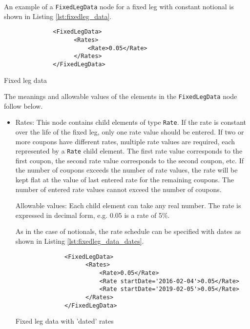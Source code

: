 An example of a \lstinline!FixedLegData! node for a fixed leg with constant notional is shown in Listing \ref{lst:fixedleg_data}.
\begin{listing}[H]
\begin{verbatim}
              <FixedLegData>
                    <Rates>
                        <Rate>0.05</Rate>
                    </Rates>
              </FixedLegData>
\end{verbatim}
\caption{Fixed leg data}
\label{lst:fixedleg_data}
\end{listing}

The meanings and allowable values of the elements in the \lstinline!FixedLegData! node follow below.

\begin{itemize}

\item Rates: This node contains child elements of type
  \lstinline!Rate!. If the rate is constant over the life of the fixed
  leg, only one rate value should be entered. If two or more coupons
  have different rates, multiple rate values are required, each
  represented by a \lstinline!Rate! child element. The first rate
  value corresponds to the first coupon, the second rate value
  corresponds to the second coupon, etc. If the number of coupons
  exceeds the number of rate values, the rate will be kept flat at the
  value of last entered rate for the remaining coupons.  The number of
  entered rate values cannot exceed the number of coupons. 

  Allowable values: Each child element can take any  real number. The rate is
  expressed in decimal form, e.g. 0.05 is a rate of 5\%.

As in the case of notionals, the rate schedule can be specified with
dates as shown in Listing \ref{lst:fixedleg_data_dates}.
\begin{listing}[H]
\begin{verbatim}
              <FixedLegData>
                    <Rates>
                        <Rate>0.05</Rate>
                        <Rate startDate='2016-02-04'>0.05</Rate>
                        <Rate startDate='2019-02-05'>0.05</Rate>
                    </Rates>
              </FixedLegData>
\end{verbatim}
\caption{Fixed leg data with 'dated' rates}
\label{lst:fixedleg_data_dates}
\end{listing}

\end{itemize}

